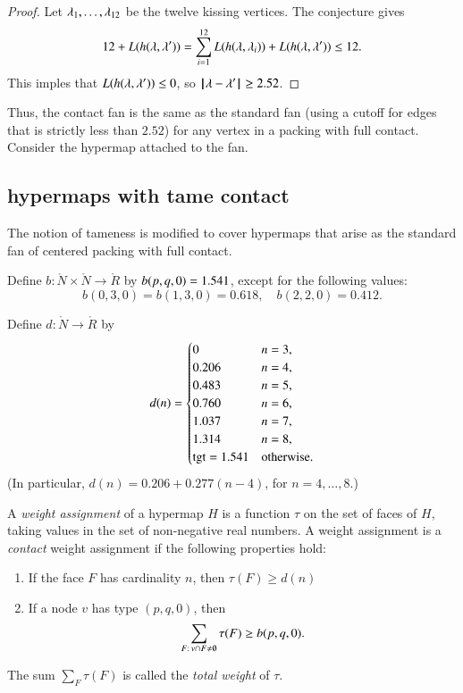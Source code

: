 \begin{proof} Let $\lambda_1,\ldots,\lambda_{12}$ be the twelve kissing vertices.  The conjecture gives
$$
12 + L(h(\lambda,\lambda')) = \sum_{i=1}^{12} L(h(\lambda,\lambda_i)) + L(h(\lambda,\lambda')) \le 12.
$$
This imples that $L(h(\lambda,\lambda'))\le 0$, so ${\hskip0.1em|\hskip-0.15em|\hskip0.1em}\lambda - \lambda'{\hskip0.1em|\hskip-0.15em|\hskip0.1em}\ge 2.52$.
\end{proof}

Thus, the contact fan is the same as the standard fan (using a cutoff for edges that is strictly less than $2.52$) for any vertex in a packing with full contact.  Consider the hypermap attached to the fan.


\subsection{hypermaps with tame contact}

The notion of tameness is modified to cover hypermaps that arise as the standard fan of centered packing with full contact.  

\begin{definition}[b]
Define $b:\ring{N}\times \ring{N}\to \ring{R}$ by $b(p,q,0)=1.541$,   except for the following values:
$$
b(0,3,0)=b(1,3,0)=0.618,\quad b(2,2,0)=0.412.
$$
\end{definition}

\begin{definition}[d]
    Define $d:\ring{N}\to \ring{R}$ by
  $$d(n) = \begin{cases}
    0 & n=3, \\
    0.206 & n=4, \\
    0.483 & n=5, \\
    0.760 & n=6, \\
    1.037 & n=7, \\
    1.314 & n=8,\\
    {\operatorname{tgt}}=1.541 & \text{otherwise}.
  \end{cases}
  $$
(In particular, $d(n) = 0.206 + 0.277 (n-4)$, for $n=4,\ldots,8$.)
\end{definition}

\begin{definition}
%
A {\it weight assignment\/} of a hypermap $H$ is a function $\tau$ on
the set of faces of $H$, taking values in the set of non-negative
real numbers. A weight assignment is a {\it contact} weight assignment if the
following properties hold:
%
\begin{enumerate}
  \item If the face $F$ has cardinality $n$, then
        $\tau(F) \ge d(n)$
  \item If a node $v$ has type $(p,q,0)$, then
        $$\sum_{F:\,v\cap F\ne\emptyset} \tau(F) \ge b{(p,q,0)}.$$
\end{enumerate}
The sum $\sum_F \tau(F)$ is called the {\it total weight} of $\tau$.
\end{definition}



